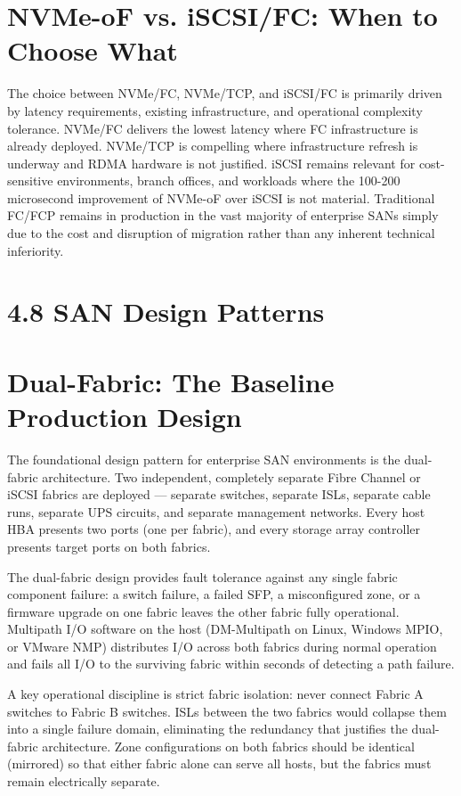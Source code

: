 \section{NVMe-oF vs. iSCSI/FC: When to Choose What}
The choice between NVMe/FC, NVMe/TCP, and iSCSI/FC is primarily driven by latency requirements, existing infrastructure, and operational complexity tolerance. NVMe/FC delivers the lowest latency where FC infrastructure is already deployed. NVMe/TCP is compelling where infrastructure refresh is underway and RDMA hardware is not justified. iSCSI remains relevant for cost-sensitive environments, branch offices, and workloads where the 100-200 microsecond improvement of NVMe-oF over iSCSI is not material. Traditional FC/FCP remains in production in the vast majority of enterprise SANs simply due to the cost and disruption of migration rather than any inherent technical inferiority.

\section{4.8 SAN Design Patterns}
\section{Dual-Fabric: The Baseline Production Design}
The foundational design pattern for enterprise SAN environments is the dual-fabric architecture. Two independent, completely separate Fibre Channel or iSCSI fabrics are deployed --- separate switches, separate ISLs, separate cable runs, separate UPS circuits, and separate management networks. Every host HBA presents two ports (one per fabric), and every storage array controller presents target ports on both fabrics.

The dual-fabric design provides fault tolerance against any single fabric component failure: a switch failure, a failed SFP, a misconfigured zone, or a firmware upgrade on one fabric leaves the other fabric fully operational. Multipath I/O software on the host (DM-Multipath on Linux, Windows MPIO, or VMware NMP) distributes I/O across both fabrics during normal operation and fails all I/O to the surviving fabric within seconds of detecting a path failure.

A key operational discipline is strict fabric isolation: never connect Fabric A switches to Fabric B switches. ISLs between the two fabrics would collapse them into a single failure domain, eliminating the redundancy that justifies the dual-fabric architecture. Zone configurations on both fabrics should be identical (mirrored) so that either fabric alone can serve all hosts, but the fabrics must remain electrically separate.

